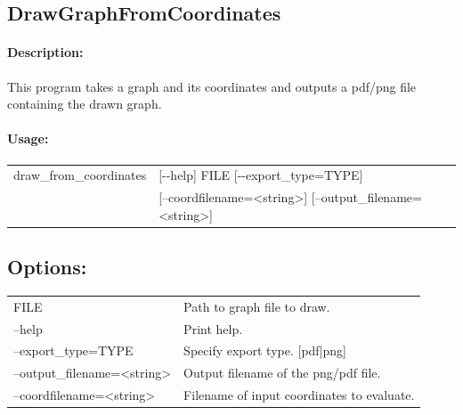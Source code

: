 \documentclass[11pt]{article}
\begin{document}
\subsection{DrawGraphFromCoordinates}
\paragraph*{Description:} This program takes a graph and its coordinates and outputs a pdf/png file containing the drawn graph.
\paragraph*{Usage:\\} 

\begin{tabular}{ll}
 draw\_from\_coordinates&   [-{}-help] FILE [-{}-export\_type=TYPE]  \\
& [--coordfilename=<string>] [--output\_filename=<string>]



\end{tabular}
                          
\subsection*{Options:\\}

\begin{tabularx}{\textwidth}{lX}
  FILE                          & Path to graph file to draw.\\
  --help                        & Print help. \\
  --export\_type=TYPE           & Specify export type. [pdf|png]\\
  --output\_filename=<string>   & Output filename of the png/pdf file. \\
  --coordfilename=<string>      & Filename of input coordinates to evaluate. \\
\end{tabularx}

\end{document}

